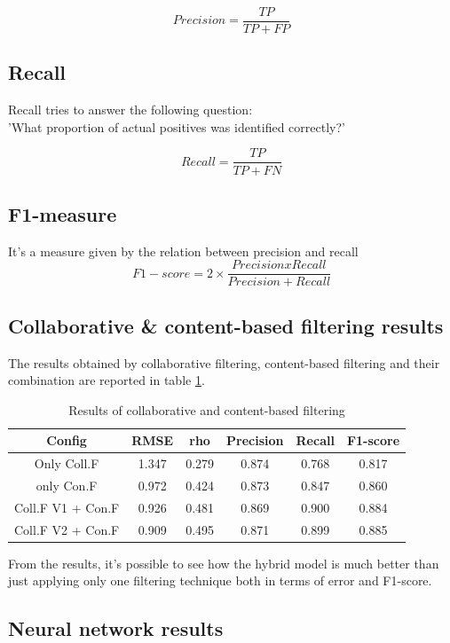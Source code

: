 \documentclass{article}
\begin{document}
\begin{equation}
      Precision = \frac{TP}{TP + FP}
\end{equation}
\subsection{Recall}
Recall tries to answer the following question:\\
'What proportion of actual positives was identified correctly?'

\begin{equation}
      Recall = \frac{TP}{TP + FN}
\end{equation}

\subsection{F1-measure}
It's a measure given by the relation between precision and recall
\begin{equation}
    F1-score = 2 \times \frac{Precision x Recall}{Precision + Recall}
\end{equation}

\subsection{Collaborative \& content-based filtering results}

The results obtained by collaborative filtering, content-based filtering and their combination are reported in table \ref{FilteringResults}.

\begin{table}[h]
      \begin{tabular}{ | c | c | c | c | c | c |} 
        \hline
        \rowcolor{lightgray} Config & RMSE & rho & Precision & Recall & F1-score \\ 
        \hline
         \cellcolor{lightgray} Only Coll.F & 1.347 & 0.279 & 0.874 & 0.768 & 0.817 \\ 
        \hline
        \cellcolor{lightgray} only Con.F & 0.972 & 0.424 & 0.873 & 0.847 & 0.860 \\ 
        \hline
        \cellcolor{lightgray}Coll.F V1 + Con.F & 0.926 & 0.481 & 0.869 & 0.900 & 0.884\\
        \hline
        \cellcolor{lightgray}Coll.F V2 + Con.F & 0.909 & 0.495 & 0.871 & 0.899 & 0.885\\
        \hline
      \end{tabular}
    \caption{Results of collaborative and content-based filtering}
    \label{FilteringResults}
\end{table}

From the results, it's possible to see how the hybrid model is much better than just applying only one filtering technique both in terms of error and F1-score.

\subsection{Neural network results}
\end{document}

